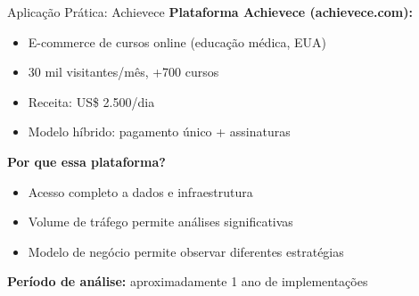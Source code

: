 \documentclass{beamer}
\begin{document}
    \begin{frame}{Aplicação Prática: Achievece}
        \textbf{Plataforma Achievece (achievece.com):}
        \begin{itemize}
            \item E-commerce de cursos online (educação médica, EUA)
            \item 30 mil visitantes/mês, +700 cursos
            \item Receita: US\$ 2.500/dia
            \item Modelo híbrido: pagamento único + assinaturas
        \end{itemize}

        \vspace{0.4cm}

        \textbf{Por que essa plataforma?}
        \begin{itemize}
            \item Acesso completo a dados e infraestrutura
            \item Volume de tráfego permite análises significativas
            \item Modelo de negócio permite observar diferentes estratégias
        \end{itemize}

        \vspace{0.3cm}

        \textbf{Período de análise:} aproximadamente 1 ano de implementações
    \end{frame}
\end{document}
